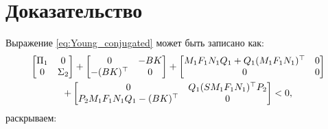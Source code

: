\chapter{Доказательство}\label{app:A}

Выражение \eqref{eq:Young_conjugated} может быть записано как:
%
\begin{multline}
	\begin{bmatrix}
		{\Pi}_1 & 0 \\ 0 & {\Sigma}_2 
	\end{bmatrix}+
	\begin{bmatrix}
		0&-{BK}\\-({BK})^\top&0
	\end{bmatrix}+
	\begin{bmatrix}
		{M}_1{F}_1{N}_1{Q}_1 + {Q}_1({M}_1{F}_1{N}_1)^\top&0 \\ 0& 0
	\end{bmatrix}
	\\ + \begin{bmatrix}
		0& {Q}_1({S} {M}_1{F}_1{N}_1)^\top{P}_2 \\
		{P}_2{M}_1{F}_1{N}_1{Q}_1 - ({BK})^\top & 0
	\end{bmatrix}<0,
\end{multline}
%
раскрываем:
%
